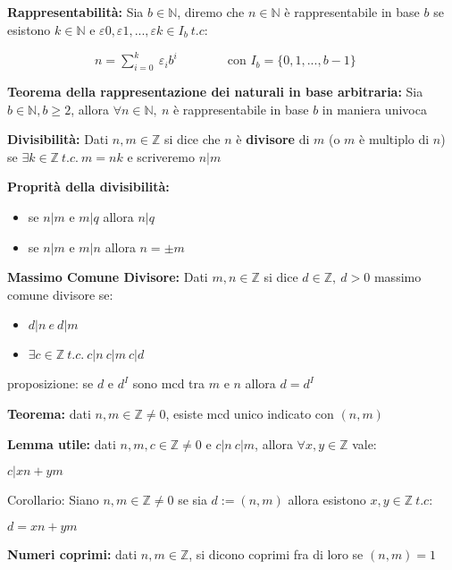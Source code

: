 \documentclass[12pt, a4paper]{article}
\begin{document}
\textbf{Rappresentabilità:} Sia $b\in\mathbb{N}$, diremo che $n\in\mathbb{N}$ è rappresentabile in base
$b$ se esistono $k\in\mathbb{N}$ e $\varepsilon{0},\varepsilon{1},...,\varepsilon{k}\in I_{b}\ t.c:$
\begin{center}
    \ \ \ \ \ \ \ \ \ \ \ \ \ \ $n = \sum_{i=0}^{k}\ \varepsilon_{i}b^{i}$\ \ \ \ \ \ \ \ con $I_{b}=\{0,1,...,b-1\}$
\end{center} 

\textbf{Teorema della rappresentazione dei naturali in base arbitraria:} Sia $b\in\mathbb{N}, b\geq 2$, allora
$\forall n\in\mathbb{N},\ n$ è rappresentabile in base $b$ in maniera univoca

\textbf{Divisibilità:} Dati $n,m\in\mathbb{Z}$ si dice che $n$ è \textbf{divisore} di $m$ (o $m$ è multiplo
di $n$) se $\exists k\in\mathbb{Z}\ t.c.\ m=nk$ e scriveremo $n|m$

\textbf{Proprità della divisibilità:}
\begin{itemize}
    \item se $n|m$ e $m|q$ allora $n|q$
    \item se $n|m$ e $m|n$ allora $n=\pm m$
\end{itemize}

\textbf{Massimo Comune Divisore:} Dati $m,n\in\mathbb{Z}$ si dice $d\in\mathbb{Z},\ d>0$ massimo comune divisore
se:
\begin{itemize}
    \item $d|n\ e\ d|m$
    \item $\exists c\in\mathbb{Z}\ t.c.\ c|n\ c|m\ c|d$
\end{itemize} 

proposizione: se $d$ e $d^{I}$ sono mcd tra $m$ e $n$ allora $d=d^{I}$

\textbf{Teorema:} dati $n,m\in\mathbb{Z} \neq 0$, esiste mcd unico indicato con $(n,m)$

\textbf{Lemma utile:} dati $n,m,c\in\mathbb{Z} \neq 0$ e $c|n\ c|m$, allora $\forall x,y\in\mathbb{Z}$ vale:
\begin{center}
    $c|xn+ym$
\end{center}

Corollario: Siano $n,m\in\mathbb{Z} \neq 0$ se sia $d:=(n,m)$ allora esistono $x,y\in\mathbb{Z}\ t.c:$
\begin{center}
    $d=xn+ym$
\end{center}

\textbf{Numeri coprimi:} dati $n,m\in\mathbb{Z}$, si dicono coprimi fra di loro se $(n,m)=1$
\end{document}
